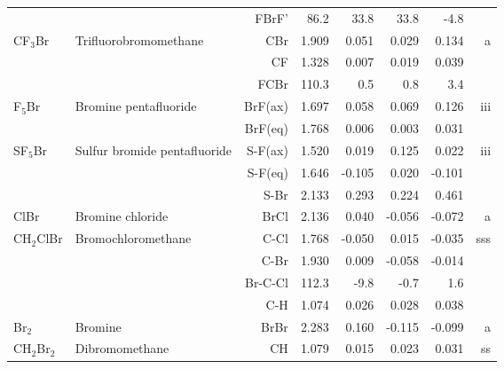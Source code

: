 \begin{table}
\begin{center}
\begin{tabular}{llrrrrrr}
             &                                    &FBrF'       &      86.2   &      33.8 &      33.8 &      -4.8   &       \\
 CF$_3$Br       & Trifluorobromomethane              &CBr           &     1.909   &     0.051 &     0.029 &     0.134 &     a \\
             &                                    &CF            &     1.328   &     0.007 &     0.019 &     0.039 &       \\
             &                                    &FCBr        &     110.3   &       0.5 &       0.8 &       3.4   &       \\
 F$_5$Br        & Bromine pentafluoride              &BrF(ax)       &     1.697   &     0.058 &     0.069 &     0.126 &   iii \\
             &                                    &BrF(eq)       &     1.768   &     0.006 &     0.003 &     0.031 &       \\
 SF$_5$Br       & Sulfur bromide pentafluoride       &S-F(ax)       &     1.520   &     0.019 &     0.125 &     0.022 &   iii \\
             &                                    &S-F(eq)       &     1.646   &    -0.105 &     0.020 &    -0.101 &       \\
             &                                    &S-Br          &     2.133   &     0.293 &     0.224 &     0.461 &       \\
 ClBr        & Bromine chloride                   &BrCl          &     2.136   &     0.040 &    -0.056 &    -0.072 &     a \\
 CH$_2$ClBr     & Bromochloromethane                 &C-Cl          &     1.768   &    -0.050 &     0.015 &    -0.035 &   sss \\
             &                                    &C-Br          &     1.930   &     0.009 &    -0.058 &    -0.014 &       \\
             &                                    &Br-C-Cl     &     112.3   &      -9.8 &      -0.7 &       1.6   &       \\
             &                                    &C-H           &     1.074   &     0.026 &     0.028 &     0.038 &       \\
 Br$_2$         & Bromine                            &BrBr          &     2.283   &     0.160 &    -0.115 &    -0.099 &     a \\
 CH$_2$Br$_2$      & Dibromomethane                     &CH            &     1.079   &     0.015 &     0.023 &     0.031 &    ss \\

\end{tabular}
\end{center}
\end{table}
